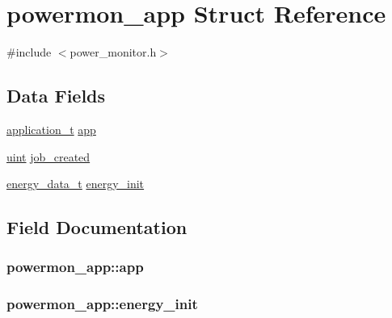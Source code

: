 \hypertarget{structpowermon__app}{}\section{powermon\+\_\+app Struct Reference}
\label{structpowermon__app}


{\ttfamily \#include $<$power\+\_\+monitor.\+h$>$}

\subsection*{Data Fields}
\begin{DoxyCompactItemize}
\item 
\hyperlink{application_8h_af0a524c43fc5f548021099181df194bf}{application\+\_\+t} \hyperlink{structpowermon__app_aded095b638b665bb8b8539df7ee991ae}{app}
\item 
\hyperlink{generic_8h_a91ad9478d81a7aaf2593e8d9c3d06a14}{uint} \hyperlink{structpowermon__app_a97f2d0fcd291e663fd239693441e8976}{job\+\_\+created}
\item 
\hyperlink{power__metrics_8h_ae55b54cbb2cfac9ff38750726746acda}{energy\+\_\+data\+\_\+t} \hyperlink{structpowermon__app_a31928cecb899a70dc84213fb41dec59a}{energy\+\_\+init}
\end{DoxyCompactItemize}


\subsection{Field Documentation}
\subsubsection[{\texorpdfstring{app}{app}}]{ powermon\+\_\+app\+::app}\hypertarget{structpowermon__app_aded095b638b665bb8b8539df7ee991ae}{}\label{structpowermon__app_aded095b638b665bb8b8539df7ee991ae}
\subsubsection[{\texorpdfstring{energy\+\_\+init}{energy_init}}]{ powermon\+\_\+app\+::energy\+\_\+init}\hypertarget{structpowermon__app_a31928cecb899a70dc84213fb41dec59a}{}\label{structpowermon__app_a31928cecb899a70dc84213fb41dec59a}
